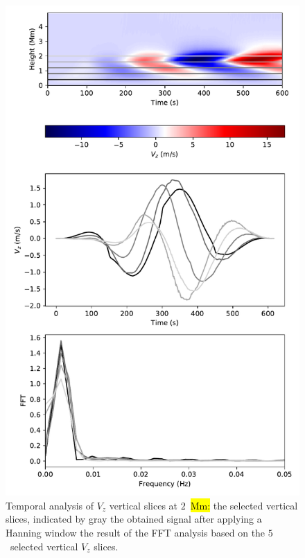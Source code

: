 \documentclass[physics,article,accept,pdftex,moreauthors]{Definitions/mdpi}
\begin{document}
\begin{figure}[H]
    \includegraphics[width=9%
.5cm]{fft_sim2.pdf}
    \caption{Temporal analysis of $V_{z}$ vertical slices at $2$~\hl{Mm:}  %
 the selected vertical slices, indicated by gray  %
 the obtained signal after applying a Hanning 
window  %
the result of the FFT analysis based on the $5$~selected vertical $V_{z}$ slices.
\label{fig11}}

\end{figure}
\end{document}
